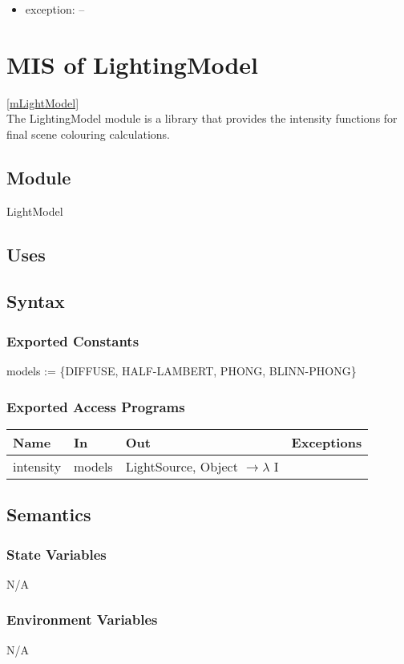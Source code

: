 \documentclass[12pt, titlepage]{article}
\begin{document}
\begin{itemize}
	\item exception: -- \\
\end{itemize}

\section{MIS of LightingModel} \ref{mLightModel} \\
The LightingModel module is a library that provides the intensity functions for 
final scene colouring calculations.
\subsection{Module}
LightModel

\subsection{Uses}

\subsection{Syntax}
\subsubsection{Exported Constants}
models := \{DIFFUSE, HALF-LAMBERT, PHONG, BLINN-PHONG\}
\subsubsection{Exported Access Programs}
\begin{center}
	\begin{tabular}{p{3cm} p{4cm} p{2cm} p{4cm}}
		\hline
		\textbf{Name} & \textbf{In} & \textbf{Out} & \textbf{Exceptions} \\
		\hline
		intensity & models & LightSource, Object $\to \lambda$ I & \\
		\hline
	\end{tabular}
\end{center}

\subsection{Semantics}
\subsubsection{State Variables}
N/A
\subsubsection{Environment Variables}
N/A
\end{document}
